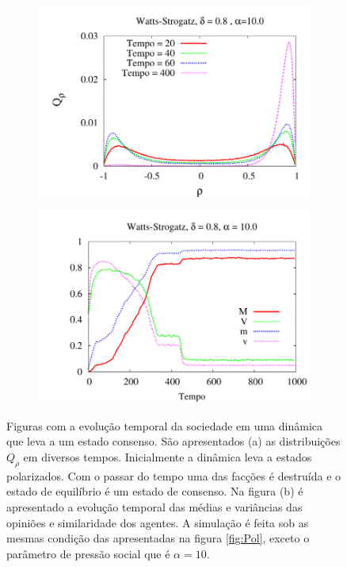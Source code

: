 \begin{figure}
    \centering
    \begin{subfigure}[]{0.5\textwidth}
        \centering
        \includegraphics[width = \textwidth]{Figures/Histograma_Watts_Strogatz_Consenso}
        \caption{}
    \end{subfigure}
    \begin{subfigure}[]{0.45\textwidth}
        \centering
        \includegraphics[width = \textwidth]{Figures/MagTempo_Consenso}
        \caption{}
    \end{subfigure}
    \newline
    \caption{
        Figuras com a evolução temporal da sociedade em uma dinâmica que
        leva a um estado consenso.  São apresentados (a) as distribuições
        $Q_\rho$ em diversos tempos. Inicialmente a dinâmica leva a estados
        polarizados.  Com o passar do tempo uma das facções é destruída
        e o estado de equilíbrio é um estado de consenso. Na figura (b)
        é apresentado a evolução temporal das médias e variâncias das
        opiniões e similaridade dos agentes.  A simulação é feita sob
        as mesmas condição das apresentadas na figura \ref{fig:Pol}, exceto
        o parâmetro de pressão social que é $\alpha=10$.
    } 
    \label{fig:Con}
\end{figure}


